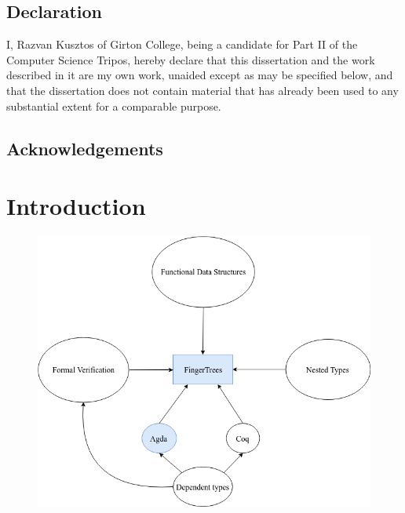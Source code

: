 \documentclass[12pt,twoside,notitlepage]{report}
\begin{document}
\newpage
\section*{Declaration}

I, Razvan Kusztos of Girton College, being a candidate for Part II of the Computer
Science Tripos, hereby declare
that this dissertation and the work described in it are my own work,
unaided except as may be specified below, and that the dissertation
does not contain material that has already been used to any substantial
extent for a comparable purpose.

\bigskip
{}

\medskip
{}

\cleardoublepage

\tableofcontents

\listoffigures

\newpage
\section*{Acknowledgements}


\cleardoublepage        %

\setcounter{page}{1}
\pagestyle{headings}


\chapter{Introduction}

\begin{figure}
\centering 

\includegraphics[scale=0.6]{flow}
\end{figure}
\end{document}
